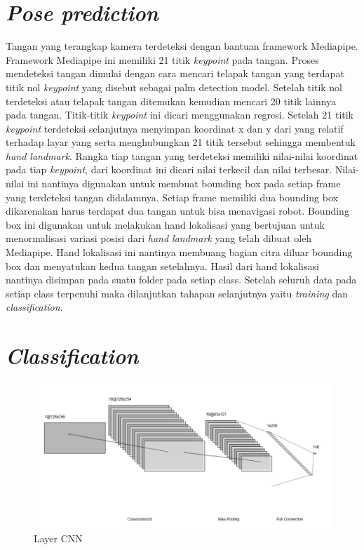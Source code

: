 \section{\emph{Pose prediction}}

Tangan yang terangkap kamera terdeteksi dengan bantuan framework Mediapipe. Framework Mediapipe ini memiliki 21 titik  \emph{keypoint} pada tangan. Proses mendeteksi tangan dimulai dengan cara mencari telapak tangan yang terdapat titik nol \emph{keypoint} yang disebut sebagai palm detection model. Setelah titik nol terdeteksi atau telapak tangan ditemukan kemudian mencari 20 titik lainnya pada tangan. Titik-titik \emph{keypoint} ini dicari menggunakan regresi. Setelah 21 titik \emph{keypoint} terdeteksi selanjutnya menyimpan koordinat x dan y dari yang relatif terhadap layar yang serta menghubungkan 21 titik tersebut sehingga membentuk \emph{hand landmark}. Rangka tiap tangan yang terdeteksi memiliki nilai-nilai koordinat pada tiap \emph{keypoint}, dari koordinat ini dicari nilai terkecil dan nilai terbesar.  Nilai-nilai ini nantinya digunakan untuk membuat bounding box pada setiap frame yang terdeteksi tangan didalamnya. Setiap frame memiliki dua bounding box dikarenakan harus terdapat dua tangan untuk bisa menavigasi robot. Bounding box ini digunakan untuk melakukan hand lokalisasi yang bertujuan untuk menormalisasi variasi posisi dari \emph{hand landmark} yang telah dibuat oleh Mediapipe. Hand lokalisasi ini nantinya membuang bagian citra diluar bounding box dan menyatukan kedua tangan setelahnya. Hasil dari hand lokalisasi nantinya disimpan pada suatu folder pada setiap class. Setelah seluruh data pada setiap class terpenuhi maka dilanjutkan tahapan selanjutnya yaitu \emph{training} dan \emph{classification}.

\section{\emph{Classification}}

\begin{figure}[!h]
  \centering
  \includegraphics[width=1\linewidth]{../Gambar/LayerCnn.png}
  \caption{Layer CNN}
  \label{fig:layerCNn}
\end{figure}

